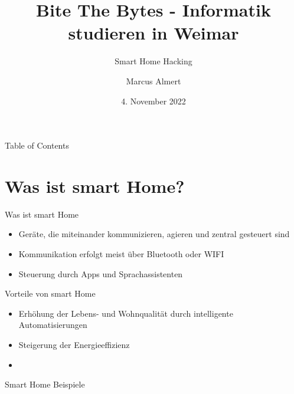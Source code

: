 \documentclass[11pt, aspectratio=169, modernfonts]{beamer}
\title[Bite the Bytes]{Bite The Bytes - Informatik studieren in Weimar}
\subtitle{\Large{Smart Home Hacking}}
\author[M. Almert]{Marcus Almert}
\institute[Bauhaus-Universität Weimar]{Bauhaus-Universität Weimar\\[0.5cm] Fakultät Medien}
\date{4. November 2022}
\begin{document}

\maketitle

\begin{frame}{Table of Contents}
    \tableofcontents
\end{frame}


\section{Was ist smart Home?}\label{sec:was-ist-smart-home?}

\begin{frame}{Was ist smart Home}
  \begin{itemize}
    \item Geräte, die miteinander kommunizieren, agieren und zentral gesteuert sind
    \item Kommunikation erfolgt meist über Bluetooth oder WIFI
    \item Steuerung durch Apps und Sprachassistenten
  \end{itemize}
\end{frame}

\begin{frame}{Vorteile von smart Home}
  \begin{itemize}
    \item Erhöhung der Lebens- und Wohnqualität durch intelligente Automatisierungen
    \item Steigerung der Energieeffizienz
    \item
  \end{itemize}
\end{frame}

\begin{frame}{Smart Home Beispiele}

\end{frame}
\end{document}
